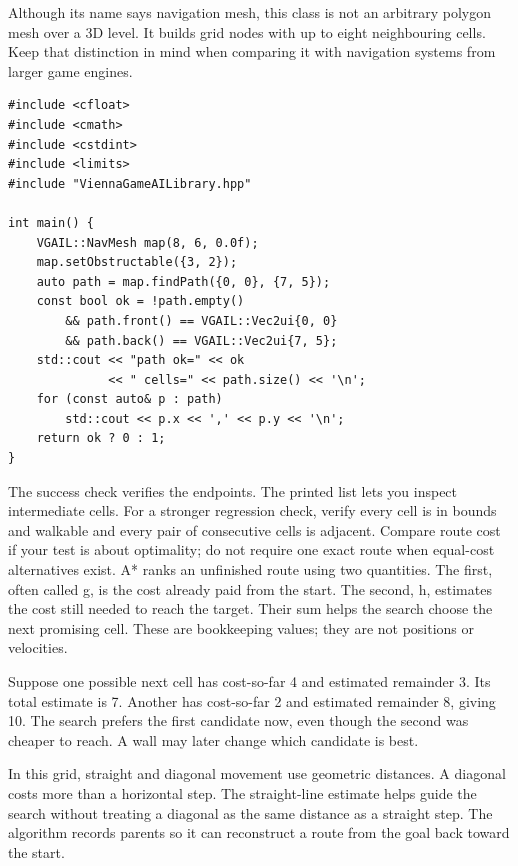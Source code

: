 \documentclass[11pt,a4paper]{article}
\begin{document}
Although its name says navigation mesh, this class is not an arbitrary polygon mesh over a 3D level. It builds grid nodes with up to eight neighbouring cells. Keep that distinction in mind when comparing it with navigation systems from larger game engines.
\begin{lstlisting}
#include <cfloat>
#include <cmath>
#include <cstdint>
#include <limits>
#include "ViennaGameAILibrary.hpp"

int main() {
    VGAIL::NavMesh map(8, 6, 0.0f);
    map.setObstructable({3, 2});
    auto path = map.findPath({0, 0}, {7, 5});
    const bool ok = !path.empty()
        && path.front() == VGAIL::Vec2ui{0, 0}
        && path.back() == VGAIL::Vec2ui{7, 5};
    std::cout << "path ok=" << ok
              << " cells=" << path.size() << '\n';
    for (const auto& p : path)
        std::cout << p.x << ',' << p.y << '\n';
    return ok ? 0 : 1;
}
\end{lstlisting}
The success check verifies the endpoints. The printed list lets you inspect intermediate cells. For a stronger regression check, verify every cell is in bounds and walkable and every pair of consecutive cells is adjacent. Compare route cost if your test is about optimality; do not require one exact route when equal-cost alternatives exist.
A* ranks an unfinished route using two quantities. The first, often called g, is the cost already paid from the start. The second, h, estimates the cost still needed to reach the target. Their sum helps the search choose the next promising cell. These are bookkeeping values; they are not positions or velocities.

Suppose one possible next cell has cost-so-far 4 and estimated remainder 3. Its total estimate is 7. Another has cost-so-far 2 and estimated remainder 8, giving 10. The search prefers the first candidate now, even though the second was cheaper to reach. A wall may later change which candidate is best.

In this grid, straight and diagonal movement use geometric distances. A diagonal costs more than a horizontal step. The straight-line estimate helps guide the search without treating a diagonal as the same distance as a straight step. The algorithm records parents so it can reconstruct a route from the goal back toward the start.
\end{document}
